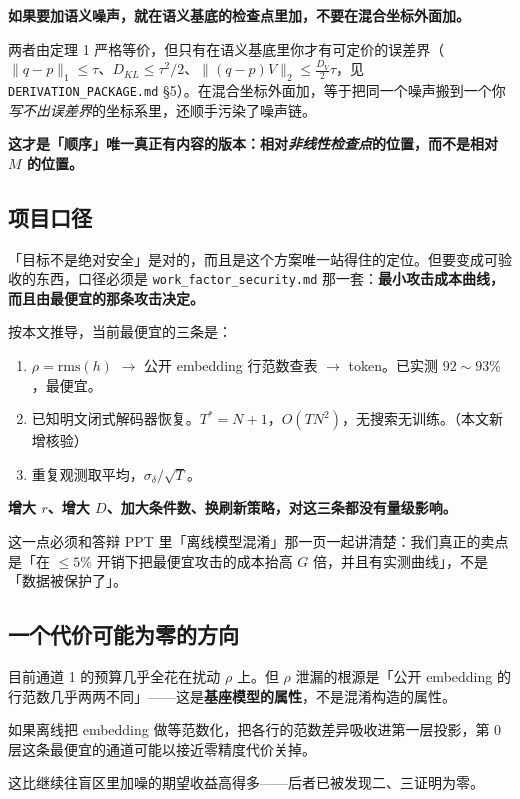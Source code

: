 \documentclass[UTF8, fontset=macnew, 11pt]{ctexart}
\begin{document}
\begin{warnbox}[通道 1 的关键工程判断]
\textbf{如果要加语义噪声，就在语义基底的检查点里加，不要在混合坐标外面加。}

两者由定理 1 严格等价，但只有在语义基底里你才有可定价的误差界（$\|q-p\|_1\le\tau$、$D_{KL}\le\tau^2/2$、$\|(q-p)V\|_2\le\tfrac{D_V}{2}\tau$，见 \texttt{DERIVATION\_PACKAGE.md} §5）。在混合坐标外面加，等于把同一个噪声搬到一个你\emph{写不出误差界}的坐标系里，还顺手污染了噪声链。

\smallskip
\textbf{这才是「顺序」唯一真正有内容的版本：相对\emph{非线性检查点}的位置，而不是相对 $M$ 的位置。}
\end{warnbox}

\subsection{项目口径}

\begin{plainbox}
「目标不是绝对安全」是对的，而且是这个方案唯一站得住的定位。但要变成可验收的东西，口径必须是 \texttt{work\_factor\_security.md} 那一套：\textbf{最小攻击成本曲线，而且由最便宜的那条攻击决定。}

按本文推导，当前最便宜的三条是：
\begin{enumerate}[label=\arabic*.]
  \item $\rho=\mathrm{rms}(h)$ $\to$ 公开 embedding 行范数查表 $\to$ token。已实测 $92\!\sim\!93\%$，最便宜。
  \item 已知明文闭式解码器恢复。$T^{*}=N+1$，$O(TN^2)$，无搜索无训练。（本文新增核验）
  \item 重复观测取平均，$\sigma_\delta/\sqrt T$。
\end{enumerate}

\textbf{增大 $r$、增大 $D$、加大条件数、换刷新策略，对这三条都没有量级影响。}

这一点必须和答辩 PPT 里「离线模型混淆」那一页一起讲清楚：我们真正的卖点是「在 $\le5\%$ 开销下把最便宜攻击的成本抬高 $G$ 倍，并且有实测曲线」，不是「数据被保护了」。
\end{plainbox}

\subsection{一个代价可能为零的方向}

\begin{plainbox}
目前通道 1 的预算几乎全花在扰动 $\rho$ 上。但 $\rho$ 泄漏的根源是「公开 embedding 的行范数几乎两两不同」——这是\textbf{基座模型的属性}，不是混淆构造的属性。

如果离线把 embedding 做等范数化，把各行的范数差异吸收进第一层投影，第 0 层这条最便宜的通道可能以接近零精度代价关掉。

这比继续往盲区里加噪的期望收益高得多——后者已被发现二、三证明为零。
\end{plainbox}
\end{document}
